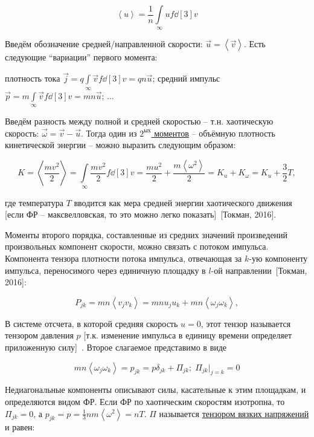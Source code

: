 \documentclass[10pt, a4paper]{article}
\newcommand{\Tokman}{~[Токман, 2016]}
\begin{document}
\begin{equation*}
	\left\langle u \right\rangle = \frac{1}{n}\int\limits_{\infty}uf\dd[3]{v}
\end{equation*}

Введём обозначение средней/направленной скорости: $\vec{u} = \left\langle \vec{v} \right\rangle$. Есть следующие ``вариации'' первого момента:

плотность тока $\vec{j} = q\int\limits_\infty\vec{v}f\dd[3]{v}=qn\vec{u}$; средний импульс $\vec{p} = m\int\limits_\infty\vec{v}f\dd[3]{v}=mn\vec{u}$; $\ldots$

Введём разность между полной и средней скоростью -- т.н. хаотическую скорость: $\vec{\omega}=\vec{v}-\vec{u}$. Тогда один из \uline{$2^\text{ых}$ моментов} -- объёмную плотность кинетической энергии -- можно выразить следующим образом:

\begin{equation*}
	K = \left\langle\frac{mv^2}{2}\right\rangle = \int\limits_\infty \frac{mv^2}{2}f\dd[3]{v} = \frac{mu^2}{2} + \frac{m\left\langle\omega^2\right\rangle }{2} = K_u + K_\omega = K_u + \frac{3}{2}T,
\end{equation*}

где температура $T$ вводится как мера средней энергии хаотического движения [если ФР -- максвелловская, то это можно легко показать]\Tokman. 

Моменты второго порядка, составленные из средних значений произведений произвольных компонент скорости, можно связать с потоком импульса. Компонента тензора плотности потока импульса, отвечающая за $k$-ую компоненту импульса, переносимого через единичную площадку в $l$-ой направлении\Tokman:

\begin{equation} \label{eq:momentum_flux_density_tensor}
	P_{jk} = mn\left\langle v_jv_k \right\rangle = mnu_ju_k+mn\left\langle \omega_j\omega_k\right\rangle,
\end{equation}

В системе отсчета, в которой средняя скорость $u=0$, этот тензор называется тензором давления $p$ [т.к. изменение импульса в единицу времени определяет приложенную силу]~\cite{golant}. Второе слагаемое представимо в виде

\begin{equation*}
	mn\left\langle \omega_j\omega_k\right\rangle = p_{jk} = p\delta_{jk}+\Pi_{jk};\;\Pi_{jk}\bigg|_{j=k} = 0
\end{equation*}

Недиагональные компоненты описывают силы, касательные к этим площадкам, и определяются видом ФР. Если ФР по хаотическим скоростям изотропна, то $\Pi_{jk} = 0$, а $p_{jk} = p = \frac{1}{3}nm\left\langle\omega^2\right\rangle=nT$. $\Pi$ называется \uline{тензором вязких напряжений} и равен:
\end{document}
